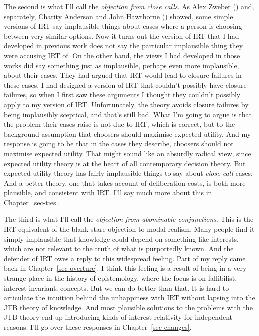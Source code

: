 \documentclass[
  12pt,
  letterpaper,
]{scrbook}
\begin{document}
The second is what I'll call the \emph{objection from close calls}. As
Alex Zweber () and, separately, Charity
Anderson and John Hawthorne
() showed, some simple
versions of IRT say implausible things about cases where a person is
choosing between very similar options. Now it turns out the version of
IRT that I had developed in previous work does not say the particular
implausible thing they were accusing IRT of. On the other hand, the
views I had developed in those works did say something just as
implausible, perhaps even more implausible, about their cases. They had
argued that IRT would lead to closure failures in these cases. I had
designed a version of IRT that couldn't possibly have closure failures,
so when I first saw these arguments I thought they couldn't possibly
apply to my version of IRT. Unfortunately, the theory avoids closure
failures by being implausibly sceptical, and that's still bad. What I'm
going to argue is that the problem their cases raise is not due to IRT,
which is correct, but to the background assumption that choosers should
maximise expected utility. And my response is going to be that in the
cases they describe, choosers should not maximise expected utility. That
might sound like an absurdly radical view, since expected utility theory
is at the heart of all contemporary decision theory. But expected
utility theory has fairly implausible things to say about \emph{close
call} cases. And a better theory, one that takes account of deliberation
costs, is both more plausible, and consistent with IRT. I'll say much
more about this in Chapter~\ref{sec-ties}.

The third is what I'll call the \emph{objection from abominable
conjunctions}. This is the IRT-equivalent of the blank stare objection
to modal realism. Many people find it simply implausible that knowledge
could depend on something like interests, which are not relevant to the
truth of what is purportedly known. And the defender of IRT owes a reply
to this widespread feeling. Part of my reply came back in
Chapter~\ref{sec-overture}. I think this feeling is a result of being in
a very strange place in the history of epistemology, where the focus is
on fallibilist, interest-invariant, concepts. But we can do better than
that. It is hard to articulate the intuition behind the unhappiness with
IRT without lapsing into the JTB theory of knowledge. And most plausible
solutions to the problems with the JTB theory end up introducing kinds
of interest-relativity for independent reasons. I'll go over these
responses in Chapter~\ref{sec-changes}.
\end{document}
